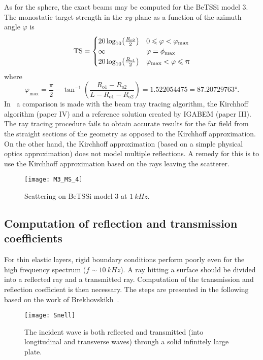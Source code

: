 As for the sphere, the exact beams may be computed for the BeTSSi model 3. The monostatic target strength in the $xy$-plane as a function of the azimuth angle $\varphi$ is 
\begin{equation*}
	\TS = \begin{cases}
		 20\log_{10}\left(\frac{R_{\mathrm{o}2}}{2}\right) & 0\leq\varphi<\varphi_{\mathrm{max}}\\
		 \infty & \varphi = \phi_{\mathrm{max}}\\
		 20\log_{10}\left(\frac{R_{\mathrm{o}1}}{2}\right) & \varphi_{\mathrm{max}}<\varphi\leq\PI
	\end{cases}
\end{equation*}
where~\cite[p. 108]{Venas2015iao}
\begin{equation*}
	\varphi_{\mathrm{max}} = \frac{\pi}{2}-\tan^{-1}\left(\frac{R_{\mathrm{o}1}-R_{\mathrm{o}2}}{L-R_{\mathrm{o}1}-R_{\mathrm{o}2}}\right) = 1.522054475 = \ang{87.20729763}.
\end{equation*}
In~ a comparison is made with the beam tray tracing algorithm, the Kirchhoff algorithm (paper IV) and a reference solution created by IGABEM (paper III). The ray tracing procedure fails to obtain accurate results for the far field from the straight sections of the geometry as opposed to the Kirchhoff approximation. On the other hand, the Kirchhoff approximation (based on a simple physical optics approximation) does not model multiple reflections. A remedy for this is to use the Kirchhoff approximation based on the rays leaving the scatterer.
\begin{figure}
	\centering
	\texttt{[image: M3\_MS\_4]}
	\caption{Scattering on BeTSSi model 3 at $\SI{1}{kHz}$.}
	\label{Fig:M3_MS}
\end{figure}

\subsection{Computation of reflection and transmission coefficients}
For thin elastic layers, rigid boundary conditions perform poorly even for the high frequency spectrum ($f \sim \SI{10}{kHz}$). A ray hitting a surface should be divided into a reflected ray and a transmitted ray. Computation of the transmission and reflection coefficient is then necessary. The steps are presented in the following based on the work of Brekhovskikh~\cite{Brekhovskikh2012wil}.
\begin{figure}
	\centering
	\texttt{[image: Snell]}
	\caption{The incident wave is both reflected and transmitted (into longitudinal and transverse waves) through a solid infinitely large plate.}
\end{figure}

